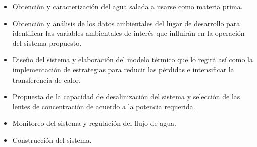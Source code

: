 	\begin{itemize}
		\item Obtención y caracterización del agua salada a usarse como materia prima.
		\item Obtención y análisis de los datos ambientales del lugar de desarrollo para identificar las variables ambientales de interés que influirán en la operación del sistema propuesto.
		\item Diseño del sistema y elaboración del modelo térmico que lo regirá así como la implementación de estrategias para reducir las pérdidas e intensificar la transferencia de calor.
		\item Propuesta de la capacidad de desalinización del sistema y selección de las lentes de concentración de acuerdo a la potencia requerida.
		\item Monitoreo del sistema y regulación del flujo de agua.
		\item Construcción del sistema.
	\end{itemize}
	
%	
